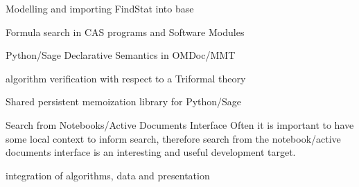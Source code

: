 \begin{workpackage}[id=dksbases,%
  title=Data/Knowledge/Software-Bases,lead=JU,
  ZHRM=12,JURM=46,UWRM=25,SARM=10,LLRM=2,PSRM=4]
\begin{wpdelivs}
\begin{wpdeliv}[due=30,id=findstat,dissem=PU,nature=OTHER,lead=JU]
      {Modelling and importing FindStat into \DKS base}
  \end{wpdeliv}
   \begin{wpdeliv}[id=cassearch,due=30,nature=OTHER,dissem=PU,lead=JU]
      {Formula search in CAS programs and Software Modules}
    \end{wpdeliv}
  \begin{wpdeliv}[due=36,id=pssem,dissem=PU,nature=OTHER,lead=JU]
      {Python/Sage Declarative Semantics in OMDoc/MMT}
  \end{wpdeliv}
  \begin{wpdeliv}[due=36,id=lfmverif,dissem=PU,nature=OTHER,lead=JU]
      {\LMFDB algorithm verification with respect to a Triformal theory}
  \end{wpdeliv}
  \begin{wpdeliv}[due=42,id=persistent-memoization,dissem=PU,nature=OTHER,lead=SA]
    {Shared persistent memoization library for Python/Sage} 
  \end{wpdeliv}
\begin{wpdeliv}[id=nbad-search,due=42,nature=OTHER,dissem=PU,lead=JU]
  {Search from Notebooks/Active Documents Interface} Often it is important to have some
  local context to inform search, therefore search from the notebook/active documents
  interface is an interesting and useful development target.
\end{wpdeliv}
  \begin{wpdeliv}[due=48,id=lfmint,dissem=PU,nature=R,lead=JU]
      {\LMFDB integration of algorithms, data and presentation}
  \end{wpdeliv}
\end{wpdelivs}

\begin{comment}
Another connection: on several occasions, we found that software was the best way to
represent certain databases of mathematical knowledge. E.g. in Algebraic Combinatorics we
have a whole zoo of Hopf algebras. Many of them are implemented in MuPAD/Sage by
specifying the objects that index the basis together with computation rules for the
product and coproduct. When we want to retrieve information about such algebras, it's
usually much more convenient to look at the code than to search through the
literature. Especially since the code is usually more correct than the literature because
it's *tested*.

We may also think of providing an interface to \LMFDB via SCSCP
protocol (http://www.symbolic-computing.org/scscp) so it may
be accessed by a variety of other systems (see their current
list at http://www.symbolic-computing.org/scscp). But it's probably as
good to access it via \Sage.

\end{comment}
\end{workpackage}

